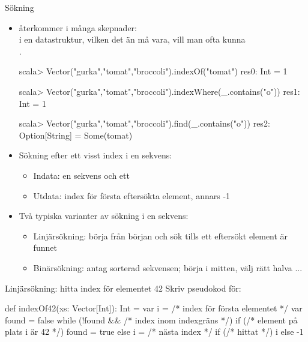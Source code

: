 

\ifkompendium\else

\begin{Slide}{Sökning}\SlideFontSmall

\begin{itemize}
\item {} återkommer i många skepnader: \\ i en datastruktur, vilken det än må vara, vill man ofta kunna \\ . 

\begin{REPL}
scala> Vector("gurka","tomat","broccoli").indexOf("tomat")
res0: Int = 1

scala> Vector("gurka","tomat","broccoli").indexWhere(_.contains("o"))
res1: Int = 1

scala> Vector("gurka","tomat","broccoli").find(_.contains("o"))
res2: Option[String] = Some(tomat)
\end{REPL}

\pause
\item Sökning efter ett visst index i en sekvens:

\begin{itemize}\SlideFontTiny
\item Indata: en sekvens och ett 
\item Utdata: index för första eftersökta element, annars -1 
\end{itemize}

\pause
\item Två typiska varianter av sökning i en sekvens:
\begin{itemize}\SlideFontTiny
\item Linjärsökning: börja från början och sök tills ett eftersökt element är funnet
\item Binärsökning: antag sorterad sekvensen; börja i mitten, välj rätt halva ...
\end{itemize}
\end{itemize}
\end{Slide}


\begin{Slide}{Linjärsökning: hitta index för elementet 42}
Skriv pseudokod för:\\ 
\pause
\begin{Code}
def indexOf42(xs: Vector[Int]): Int = {
  var i = /* index för första elementet */
  var found = false
  while (!found && /* index inom indexgräns */) {
    if (/* element på plats i är 42 */) found = true 
    else i = /* nästa index */
  }
  if (/* hittat */) i else -1
} 
\end{Code}
\end{Slide}

